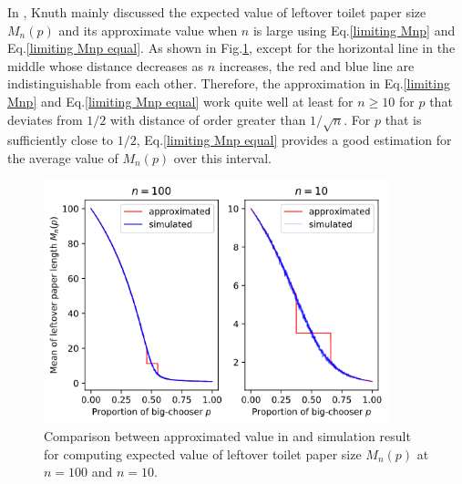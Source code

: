 \documentclass{article}
\begin{document}
In \cite{Knuth1984}, Knuth mainly discussed the expected value of leftover toilet paper size $M_n(p)$ and its approximate value when $n$ is large using Eq.\eqref{limiting Mnp} and Eq.\eqref{limiting Mnp equal}. As shown in Fig.\ref{2roll-approximation}, except for the horizontal line in the middle whose distance decreases as $n$ increases, the red and blue line are indistinguishable from each other. Therefore, the approximation in Eq.\eqref{limiting Mnp} and Eq.\eqref{limiting Mnp equal} work quite well at least for $n \geq 10$ for $p$ that deviates from $1/2$ with distance of order greater than $1/\sqrt{n}$. For $p$ that is sufficiently close to $1/2$, Eq.\eqref{limiting Mnp equal} provides a good estimation for the average value of $M_n(p)$ over this interval.
\begin{figure}[ht]
    \centering
    \includegraphics[width=10cm]{approxim-2roll.png}
    \caption{Comparison between approximated value in \cite{Knuth1984} and simulation result for computing expected value of leftover toilet paper size $M_n(p)$ at $n=100$ and $n=10$.}
    \label{2roll-approximation}
\end{figure} 
\end{document}
